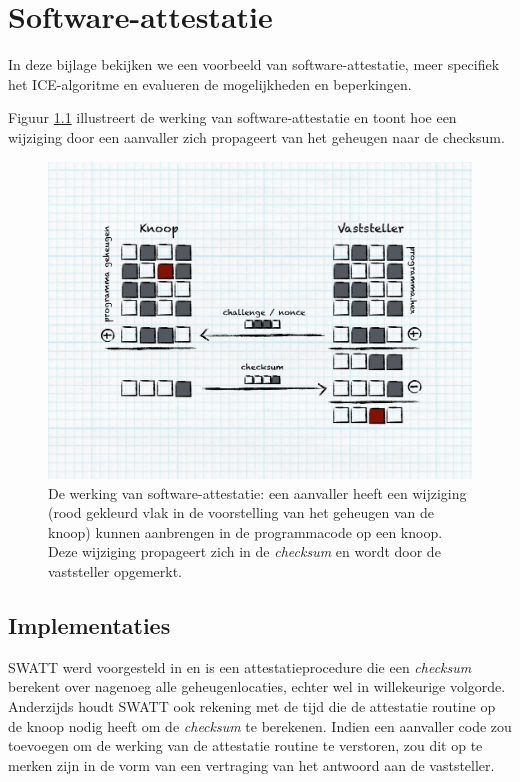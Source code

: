 
\chapter{Software-attestatie}
\label{appendix:attestation}

In deze bijlage bekijken we een voorbeeld van software-attestatie, meer
specifiek het ICE-algoritme \citep{seshadri2006scuba, seshadri2008sake} en
evalueren de mogelijkheden en beperkingen.

Figuur \ref{fig:attestation-process} illustreert de werking van
software-attestatie en toont hoe een wijziging door een aanvaller zich
propageert van het geheugen naar de checksum.

\begin{figure}[ht] \centering
\includegraphics[width=0.9\linewidth]{resources/attestation-process.pdf}
\caption[De werking van software-attestatie]{De werking van
software-attestatie: een aanvaller heeft een wijziging (rood gekleurd vlak in
de voorstelling van het geheugen van de knoop) kunnen aanbrengen in de
programmacode op een knoop. Deze wijziging propageert zich in de
\emph{checksum} en wordt door de vaststeller opgemerkt.}
\label{fig:attestation-process} \end{figure}

\section{Implementaties}

SWATT werd voorgesteld in \citep{seshadri2004swatt} en is een
attestatieprocedure die een \emph{checksum} berekent over nagenoeg alle
geheugenlocaties, echter wel in willekeurige volgorde. Anderzijds houdt SWATT
ook rekening met de tijd die de attestatie routine op de knoop nodig heeft om
de \emph{checksum} te berekenen. Indien een aanvaller code zou toevoegen om de
werking van de attestatie routine te verstoren, zou dit op te merken zijn in de
vorm van een vertraging van het antwoord aan de vaststeller.


